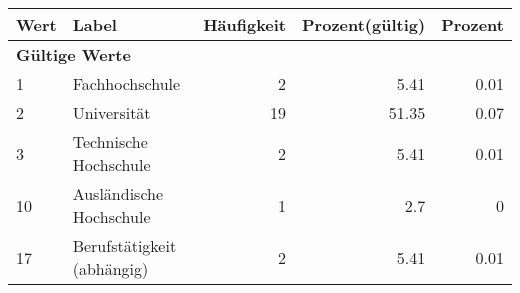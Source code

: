      \begin{longtable}{lXrrr}
     \toprule
     \textbf{Wert} & \textbf{Label} & \textbf{Häufigkeit} & \textbf{Prozent(gültig)} & \textbf{Prozent} \\
     \endhead
     \midrule
     \multicolumn{5}{l}{\textbf{Gültige Werte}}\\

     1 &
     \multicolumn{1}{X}{ Fachhochschule   } &


       \num{2} &
       \num[round-mode=places,round-precision=2]{5.41} &
         \num[round-mode=places,round-precision=2]{0.01} \\

     2 &
     \multicolumn{1}{X}{ Universität   } &


       \num{19} &
       \num[round-mode=places,round-precision=2]{51.35} &
         \num[round-mode=places,round-precision=2]{0.07} \\

     3 &
     \multicolumn{1}{X}{ Technische Hochschule   } &


       \num{2} &
       \num[round-mode=places,round-precision=2]{5.41} &
         \num[round-mode=places,round-precision=2]{0.01} \\

     10 &
     \multicolumn{1}{X}{ Ausländische Hochschule   } &


       \num{1} &
       \num[round-mode=places,round-precision=2]{2.7} &
         \num[round-mode=places,round-precision=2]{0} \\

     17 &
     \multicolumn{1}{X}{ Berufstätigkeit (abhängig)   } &


       \num{2} &
       \num[round-mode=places,round-precision=2]{5.41} &
         \num[round-mode=places,round-precision=2]{0.01} \\


\end{longtable}
